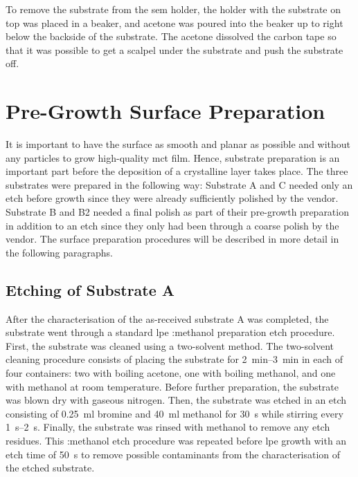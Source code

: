 To remove the substrate from the \ac{sem} holder, the holder with the substrate on top was placed in a beaker, and acetone was poured into the beaker up to right below the backside of the substrate. The acetone dissolved the carbon tape so that it was possible to get a scalpel under the substrate and push the substrate off. %

\section{Pre-Growth Surface Preparation}
It is important to have the surface as smooth and planar as possible and without any particles to grow high-quality \ac{mct} film. Hence, substrate preparation is an important part before the deposition of a crystalline layer takes place. The three substrates were prepared in the following way: Substrate A and C needed only an etch before growth since they were already sufficiently polished by the vendor. Substrate B and B2 needed a final polish as part of their pre-growth preparation in addition to an etch since they only had been through a coarse polish by the vendor. The surface preparation procedures will be described in more detail in the following paragraphs.

\subsection{Etching of Substrate A}\label{sec:subA_etch}

After the characterisation of the as-received substrate A was completed, the substrate went through a standard \ac{lpe} :methanol preparation etch procedure. First, the substrate was cleaned using a two-solvent method. The two-solvent cleaning procedure consists of placing the substrate for \SIrange{2}{3}{\minute} in each of four containers: two with boiling acetone, one with boiling methanol, and one with methanol at room temperature. Before further preparation, the substrate was blown dry with gaseous nitrogen. Then, the substrate was etched in an etch consisting of \SI{0.25}{\milli\litre} bromine and \SI{40}{\milli\litre} methanol for \SI{30}{\second} while stirring every \SIrange{1}{2}{\second}. Finally, the substrate was rinsed with methanol to remove any etch residues. This :methanol etch procedure was repeated before \ac{lpe} growth with an etch time of \SI{50}{\second} to remove possible contaminants from the characterisation of the etched substrate. %

